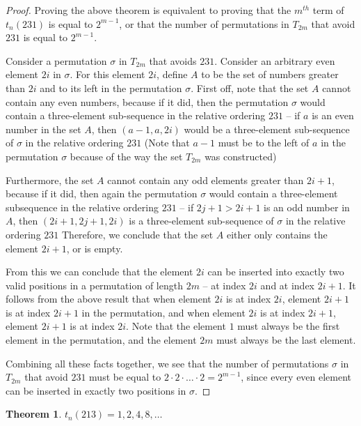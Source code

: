 \documentclass[11pt,letterpaper,twoside,english]{article}
\theoremstyle{theorem}
\newtheorem{theorem}{Theorem}
\theoremstyle{remark}
\begin{document}
\begin{proof}
Proving the above theorem is equivalent to proving that the $m^{th}$ term of $t_n(231)$ is equal to $2^{m-1}$, or that the number of permutations in $T_{2m}$ that avoid $231$ is equal to $2^{m-1}$.

Consider a permutation $\sigma$ in $T_{2m}$ that avoids $231$. Consider an arbitrary even element $2i$ in $\sigma$. For this element $2i$, define $A$ to be the set of numbers greater than $2i$ and to its left in the permutation $\sigma$. First off, note that the set $A$ cannot contain any even numbers, because if it did, then the permutation $\sigma$ would contain a three-element sub-sequence in the relative ordering $231$ -- if $a$ is an even number in the set $A$, then $(a-1, a, 2i)$ would be a three-element sub-sequence of $\sigma$ in the relative ordering $231$ (Note that $a-1$ must be to the left of $a$ in the permutation $\sigma$ because of the way the set $T_{2m}$ was constructed)

Furthermore, the set $A$ cannot contain any odd elements greater than $2i+1$, because if it did, then again the permutation $\sigma$ would contain a three-element subsequence in the relative ordering $231$ -- if $2j+1 > 2i+1$ is an odd number in $A$, then $(2i+1, 2j+1, 2i)$ is a three-element sub-sequence of $\sigma$ in the relative ordering $231$ Therefore, we conclude that the set $A$ either only contains the element $2i+1$, or is empty.

From this we can conclude that the element $2i$ can be inserted into exactly two valid positions in a permutation of length $2m$ -- at index $2i$ and at index $2i+1$. It follows from the above result that when element $2i$ is at index $2i$, element $2i+1$ is at index $2i+1$ in the permutation, and when element $2i$ is at index $2i+1$, element $2i+1$ is at index $2i$. Note that the element $1$ must always be the first element in the permutation, and the element $2m$ must always be the last element.

Combining all these facts together, we see that the number of permutations $\sigma$ in $T_{2m}$ that avoid $231$ must be equal to $2 \cdot 2 \cdot \ldots \cdot 2 = 2^{m-1}$, since every even element can be inserted in exactly two positions in $\sigma$.

\end{proof}

\begin{theorem}
$t_n(213) = 1, 2, 4, 8, \ldots$
\end{theorem}
\end{document}
